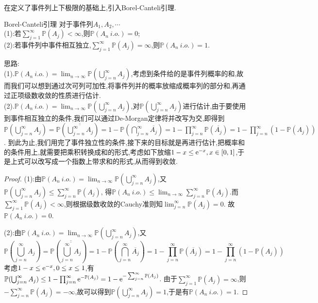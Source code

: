 在定义了事件列上下极限的基础上,引入Borel-Canteli引理.
\begin{theorem}{Borel-Canteli引理}
    对于事件列$A_1,A_2,\cdots$\\
    (1):若$\sum_{j=1}^{\infty}\mathbb{P}(A_j)<\infty$,则$\mathbb{P}(A_n \ i.o.)=0$;\\
    (2):若事件列中事件相互独立,$\sum_{j=1}^{\infty}\mathbb{P}(A_j)=\infty$,则$\mathbb{P}(A_n \ i.o.)=1$.
\end{theorem}
{\kaishu
\noindent 思路:\\
(1).$\mathbb{P}(A_n\ i.o.)=\lim_{n\to\infty}\mathbb{P}(\bigcup_{j=n}^{\infty}A_j)$,考虑到条件给的是事件列概率的和,故而我们可以想到通过次可列可加性,将事件列并的概率放缩成概率列的部分和,再通过正项级数收敛的性质进行估计.\\
(2).$\mathbb{P}(A_n\ i.o.)=\lim_{n\to\infty}\mathbb{P}(\bigcup_{j=n}^{\infty}A_j)$,对$\mathbb{P}(\bigcup_{j=n}^{\infty}A_j)$进行估计,由于要使用到事件相互独立的条件,我们可以通过De-Morgan定律将并改写为交,即得到
$\mathbb{P}(\bigcup_{j=n}^{\infty}A_j)=\mathbb{P}(\overline{\overline{\bigcup_{j=n}^{\infty}A_j}})=1-\mathbb{P}(\bigcap_{j=n}^{\infty}\overline{A_j})=1-\prod_{j=n}^{\infty}\mathbb{P}(\overline{A_j})=1-\prod_{j=n}^{\infty}(1-\mathbb{P}(A_j))$.
到此为止,我们用完了事件独立性的条件,接下来的目标就是再进行估计,把概率和的条件用上,就需要把乘积转换成和的形式,考虑如下放缩$1-x\leq {\rm e}^{-x},x\in[0,1]$,于是上式可以改写成一个指数上带求和的形式,从而得到收敛.
}
\begin{proof}
    (1):由$\mathbb{P}(A_n\ i.o.)=\lim_{n\to\infty}\mathbb{P}(\bigcup_{j=n}^{\infty}A_j)$,又$\mathbb{P}(\bigcup_{j=n}^{\infty}A_j)\leq \sum_{j=n}^{\infty}\mathbb{P}(A_j)$,
    得$\mathbb{P}(A_n\ i.o.)\leq \lim_{n\to\infty}\sum_{j=n}^{\infty}\mathbb{P}(A_j)$.而$\sum_{j=1}^{\infty}\mathbb{P}(A_j)<\infty$,则根据级数收敛的Cauchy准则知$\lim_{j=n}^{\infty}\mathbb{P}(A_j)=0$.
    故$\mathbb{P}(A_n\ i.o.)=0$.

    (2):由$\mathbb{P}(A_n\ i.o.)=\lim_{n\to\infty}\mathbb{P}(\bigcup_{j=n}^{\infty}A_j)$,又$$\mathbb{P}(\bigcup_{j=n}^{\infty}A_j)=\mathbb{P}(\overline{\overline{\bigcup_{j=n}^{\infty}A_j}})=1-\mathbb{P}(\bigcap_{j=n}^{\infty}\overline{A_j})=1-\prod_{j=n}^{\infty}\mathbb{P}(\overline{A_j})=1-\prod_{j=n}^{\infty}(1-\mathbb{P}(A_j))$$
    考虑$1-x\leq{\rm e}^{-x},0\leq x\leq 1$,有$\mathbb{P}(\bigcup_{j=n}^{\infty}A_j)\leq 1-\prod_{j=n}^{\infty}{\rm e}^{-\mathbb{P}(A_j)}=1-{\rm e}^{-\sum_{j=n}^{\infty}\mathbb{P}(A_j)}$.
    由于$\sum_{j=1}^{\infty}\mathbb{P}(A_j)=\infty$,则$-\sum_{j=n}^{\infty}\mathbb{P}(A_j)=-\infty$,故可以得到$\mathbb{P}(\bigcup_{j=n}^{\infty}A_j)=1$,于是有$\mathbb{P}(A_n\ i.o.)=1$.
\end{proof}

